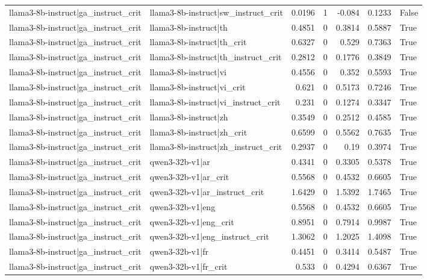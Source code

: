 \begin{table}
\begin{tabular}{l l r r r r l}
llama3-8b-instruct|ga_instruct_crit & llama3-8b-instruct|sw_instruct_crit & 0.0196 & 1 & -0.084 & 0.1233 & False \\
llama3-8b-instruct|ga_instruct_crit & llama3-8b-instruct|th & 0.4851 & 0 & 0.3814 & 0.5887 & True \\
llama3-8b-instruct|ga_instruct_crit & llama3-8b-instruct|th_crit & 0.6327 & 0 & 0.529 & 0.7363 & True \\
llama3-8b-instruct|ga_instruct_crit & llama3-8b-instruct|th_instruct_crit & 0.2812 & 0 & 0.1776 & 0.3849 & True \\
llama3-8b-instruct|ga_instruct_crit & llama3-8b-instruct|vi & 0.4556 & 0 & 0.352 & 0.5593 & True \\
llama3-8b-instruct|ga_instruct_crit & llama3-8b-instruct|vi_crit & 0.621 & 0 & 0.5173 & 0.7246 & True \\
llama3-8b-instruct|ga_instruct_crit & llama3-8b-instruct|vi_instruct_crit & 0.231 & 0 & 0.1274 & 0.3347 & True \\
llama3-8b-instruct|ga_instruct_crit & llama3-8b-instruct|zh & 0.3549 & 0 & 0.2512 & 0.4585 & True \\
llama3-8b-instruct|ga_instruct_crit & llama3-8b-instruct|zh_crit & 0.6599 & 0 & 0.5562 & 0.7635 & True \\
llama3-8b-instruct|ga_instruct_crit & llama3-8b-instruct|zh_instruct_crit & 0.2937 & 0 & 0.19 & 0.3974 & True \\
llama3-8b-instruct|ga_instruct_crit & qwen3-32b-v1|ar & 0.4341 & 0 & 0.3305 & 0.5378 & True \\
llama3-8b-instruct|ga_instruct_crit & qwen3-32b-v1|ar_crit & 0.5568 & 0 & 0.4532 & 0.6605 & True \\
llama3-8b-instruct|ga_instruct_crit & qwen3-32b-v1|ar_instruct_crit & 1.6429 & 0 & 1.5392 & 1.7465 & True \\
llama3-8b-instruct|ga_instruct_crit & qwen3-32b-v1|eng & 0.5568 & 0 & 0.4532 & 0.6605 & True \\
llama3-8b-instruct|ga_instruct_crit & qwen3-32b-v1|eng_crit & 0.8951 & 0 & 0.7914 & 0.9987 & True \\
llama3-8b-instruct|ga_instruct_crit & qwen3-32b-v1|eng_instruct_crit & 1.3062 & 0 & 1.2025 & 1.4098 & True \\
llama3-8b-instruct|ga_instruct_crit & qwen3-32b-v1|fr & 0.4451 & 0 & 0.3414 & 0.5487 & True \\
llama3-8b-instruct|ga_instruct_crit & qwen3-32b-v1|fr_crit & 0.533 & 0 & 0.4294 & 0.6367 & True \\

\end{tabular}
\end{table}
